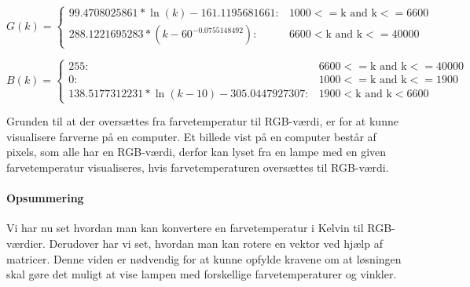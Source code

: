 \begin{displaymath}
   G(k) = \left\{
     \begin{array}{lr}
       99.4708025861*\ln(k)-161.1195681661: & 1000 <= \text{k and k} <= 6600\\
       288.1221695283*(k-60^{-0.0755148492}): & 6600< \text{k and k} <= 40000
     \end{array}
   \right.
\end{displaymath} 

\begin{displaymath}
   B(k) = \left\{
     \begin{array}{lr}
       255: & 6600 <= \text{k and k} <= 40000\\
       0: & 1000 <= \text{k and k} <= 1900\\
       138.5177312231 * \ln(k-10) - 305.0447927307: & 1900 < \text{k and k} < 6600
     \end{array}
   \right.
\end{displaymath} 

Grunden til at der oversættes fra farvetemperatur til RGB-værdi, er for at kunne visualisere farverne på en computer. Et billede vist på en computer består af pixels, som alle har en RGB-værdi, derfor kan lyset fra en lampe med en given farvetemperatur visualiseres, hvis farvetemperaturen oversættes til RGB-værdi.

\paragraph*{Opsummering}
Vi har nu set hvordan man kan konvertere en farvetemperatur i Kelvin til RGB-værdier. Derudover har vi set, hvordan man kan rotere en vektor ved hjælp af matricer. Denne viden er nødvendig for at kunne opfylde kravene om at løsningen skal gøre det muligt at vise lampen med forskellige farvetemperaturer og vinkler. 









